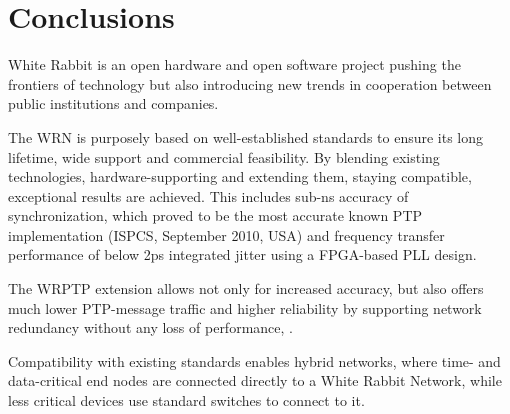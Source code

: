 \section{Conclusions}

White Rabbit is an open hardware  and open software project pushing the
frontiers of technology but also introducing new trends in
cooperation between public institutions and companies.

The WRN is purposely based on well-established
standards to ensure its long lifetime, wide support and commercial
feasibility. 
By blending existing technologies, hardware-supporting and extending
them,  %
staying compatible, exceptional results are achieved. This
includes sub-ns accuracy of  synchronization, which 
proved to be the
most accurate known PTP implementation (ISPCS, September 2010, USA) and frequency
transfer performance of below 2ps integrated jitter using a FPGA-based
PLL design.

The WRPTP extension allows not only for increased accuracy,
but also offers much lower PTP-message traffic and higher reliability
by supporting network redundancy without any loss of performance, 
.

Compatibility with existing standards enables hybrid networks, where
time- and data-critical end nodes are connected directly to a White
Rabbit Network, while less critical devices use standard switches to
connect to it.